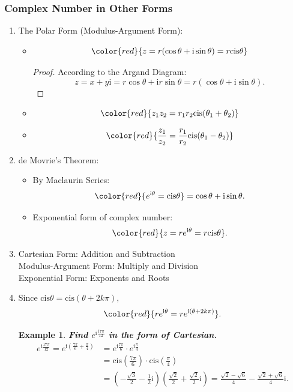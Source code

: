 \documentclass[12pt, a4paper]{article}
\newtheorem{example}{Example}[subsection]
\newtheorem{proof}{Proof}[subsection]
\def\i{{\mathrm{i}}}
\def\cis{\mathrm{cis}}
\begin{document}
\subsubsection{Complex Number in Other Forms}
\begin{enumerate}
  \item The Polar Form (Modulus-Argument Form): 
  \begin{itemize}
    \item $${\color{red}{z=r(\cos\theta+\i\sin\theta)=r\cis\theta}}$$
    \begin{proof}
      According to the Argand Diagram: 
      $$z=x+y\i=r\cos\theta+\i r\sin\theta=r(\cos\theta+\i\sin\theta).$$
    \end{proof}
    \item $${\color{red}{z_1z_2=r_1r_2\cis(\theta_1+\theta_2)}}$$
    \item $${\color{red}{\frac{z_1}{z_2}=\frac{r_1}{r_2}\cis(\theta_1-\theta_2)}}$$
  \end{itemize}
  \item de Movrie's Theorem: 
  \begin{itemize}
    \item By Maclaurin Series: $${\color{red}{e^{\i\theta}=\cis\theta}}=\cos\theta+\i\sin\theta.$$
    \item Exponential form of complex number: 
    $${\color{red}{z=re^{\i\theta}=r\cis\theta}}.$$
  \end{itemize}
  \item Cartesian Form: Addition and Subtraction\\
  Modulus-Argument Form: Multiply and Division\\
  Exponential Form: Exponents and Roots
  \item Since $\cis\theta=\cis(\theta+2k\pi),$ 
  $${\color{red}{re^{\i\theta}=re^{\i(\theta+2k\pi)}}}.$$
  \begin{example}
    \textbf{Find $e^{\i\frac{17\pi}{12}}$ in the form of Cartesian.}
    $$\begin{aligned}
      e^{\i\frac{17\pi}{12}}=e^{\i\left(\frac{7\pi}{6}+\frac{\pi}{4}\right)}&=e^{\i\frac{7\pi}{6}}\cdot e^{\i\frac{\pi}{4}}\\
      &=\cis\left(\frac{7\pi}{6}\right)\cdot\cis\left(\frac{\pi}{4}\right)\\
      &=\left(-\frac{\sqrt{3}}{2}-\frac{1}{2}\i\right)\left(\frac{\sqrt{2}}{2}+\frac{\sqrt{2}}{2}\i\right)=\frac{\sqrt{2}-\sqrt{6}}{4}-\frac{\sqrt{2}+\sqrt{6}}{4}\i.
    \end{aligned}$$
  \end{example}
\end{enumerate}
\end{document}
